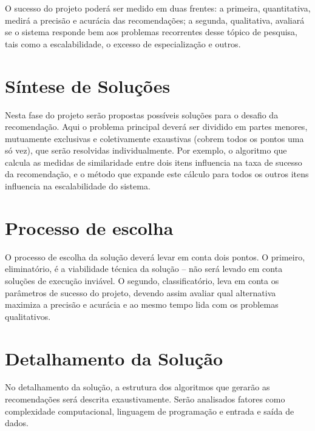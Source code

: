 
O sucesso do projeto poderá ser medido em duas frentes: a primeira, quantitativa, medirá a precisão e acurácia das recomendações; a segunda, qualitativa, avaliará se o sistema responde bem aos problemas recorrentes desse tópico de pesquisa, tais como a escalabilidade, o excesso de especialização e outros. 

\section{Síntese de Soluções} %
\label{sec:s_ntese_de_solu_es}


Nesta fase do projeto serão propostas possíveis soluções para o desafio da recomendação. Aqui o problema principal deverá ser dividido em partes menores, mutuamente exclusivas e coletivamente exaustivas (cobrem todos os pontos uma só vez), que serão resolvidas individualmente. Por exemplo, o algoritmo que calcula as medidas de similaridade entre dois itens influencia na taxa de sucesso da recomendação, e o método que expande este cálculo para todos os outros itens influencia na escalabilidade do sistema.

\section{Processo de escolha} %
\label{sec:processo_de_escolha}


O processo de escolha da solução deverá levar em conta dois pontos. O primeiro, eliminatório, é a viabilidade técnica da solução -- não será levado em conta soluções de execução inviável. O segundo, classificatório, leva em conta os parâmetros de sucesso do projeto, devendo assim avaliar qual alternativa maximiza a precisão e acurácia e ao mesmo tempo lida com os problemas qualitativos.

\section{Detalhamento da Solução} %
\label{sec:detalhamento_da_solu_o}


No detalhamento da solução, a estrutura dos algoritmos que gerarão as recomendações será descrita exaustivamente. Serão analisados fatores como complexidade computacional, linguagem de programação e entrada e saída de dados.

